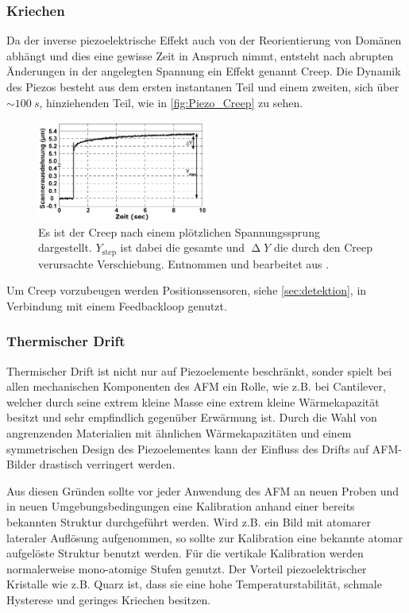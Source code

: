     \subsubsection*{Kriechen} \vspace*{-0.25cm}
        Da der inverse piezoelektrische Effekt auch von der Reorientierung von Domänen abhängt und dies eine gewisse Zeit in Anspruch nimmt, entsteht nach abrupten Änderungen in der angelegten Spannung ein Effekt genannt \glqq Creep\grqq.
        Die Dynamik des Piezos besteht aus dem ersten instantanen Teil und einem zweiten, sich über $\sim \SI{100}{s}$, hinziehenden Teil, wie in \autoref{fig:Piezo_Creep} zu sehen.
        \begin{figure}[ht]
            \centering\captionsetup{format=plain}
            \includegraphics[width=0.5\textwidth]{bilder/Piezo_Creep.png}
            \caption{Es ist der Creep nach einem plötzlichen Spannungssprung dargestellt. $Y_{\mathrm{step}}$ ist dabei die gesamte und $\upDelta Y$ die durch den Creep verursachte Verschiebung. Entnommen und bearbeitet aus \cite{Compensation_of_Scanner_Creep}.}
            \label{fig:Piezo_Creep}
        \end{figure}
        Um Creep vorzubeugen werden Positionssensoren, siehe \autoref{sec:detektion}, in Verbindung mit einem Feedbackloop genutzt.
        

    \subsubsection*{Thermischer Drift} \vspace*{-0.25cm}
        Thermischer Drift ist nicht nur auf Piezoelemente beschränkt, sonder spielt bei allen mechanischen Komponenten des AFM ein Rolle, wie z.B. bei Cantilever, welcher durch seine extrem kleine Masse eine extrem kleine Wärmekapazität besitzt und sehr empfindlich gegenüber Erwärmung ist.
        Durch die Wahl von angrenzenden Materialien mit ähnlichen Wärmekapazitäten und einem symmetrischen Design des Piezoelementes kann der Einfluss des Drifts auf AFM-Bilder drastisch verringert werden.
        
    \vspace*{0.5cm}
    Aus diesen Gründen sollte vor jeder Anwendung des AFM an neuen Proben und in neuen Umgebungsbedingungen eine Kalibration anhand einer bereits bekannten Struktur durchgeführt werden.
    Wird z.B. ein Bild mit atomarer lateraler Auflösung aufgenommen, so sollte zur Kalibration eine bekannte atomar aufgelöste Struktur benutzt werden.
    Für die vertikale Kalibration werden normalerweise mono-atomige Stufen genutzt.
    Der Vorteil piezoelektrischer Kristalle wie z.B. Quarz ist, dass sie eine hohe Temperaturstabilität, schmale Hysterese und geringes Kriechen besitzen.